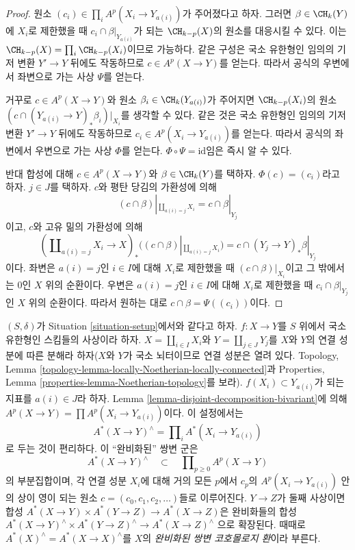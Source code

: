 \begin{proof}
원소 $(c_i) \in \prod_i A^p(X_i \to Y_{a(i)})$가 주어졌다고 하자.
그러면 $\beta \in \CH_k(Y)$에 $X_i$로 제한했을 때
$c_i \cap \beta|_{Y_{a(i)}}$가 되는 $\CH_{k - p}(X)$의 원소를
대응시킬 수 있다. 이는
$\CH_{k - p}(X) = \prod_i \CH_{k - p}(X_i)$이므로 가능하다.
같은 구성은 국소 유한형인 임의의 기저 변환 $Y' \to Y$ 뒤에도
작동하므로 $c \in A^p(X \to Y)$를 얻는다. 따라서 공식의 우변에서
좌변으로 가는 사상 $\Psi$를 얻는다.

거꾸로 $c \in A^p(X \to Y)$와 원소
$\beta_i \in \CH_k(Y_{a(i)})$가 주어지면
$\CH_{k - p}(X_i)$의 원소
$(c \cap (Y_{a(i)} \to Y)_*\beta_i)|_{X_i}$를 생각할 수 있다.
같은 것은 국소 유한형인 임의의 기저 변환 $Y' \to Y$ 뒤에도
작동하므로 $c_i \in A^p(X_i \to Y_{a(i)})$를 얻는다. 따라서 공식의
좌변에서 우변으로 가는 사상 $\Phi$를 얻는다.
$\Phi \circ \Psi = \text{id}$임은 즉시 알 수 있다.

반대 합성에 대해 $c \in A^p(X \to Y)$와
$\beta \in \CH_k(Y)$를 택하자. $\Phi(c) = (c_i)$라고 하자.
$j \in J$를 택하자. $c$와 평탄 당김의 가환성에 의해
$$
(c \cap \beta)|_{\coprod_{a(i) = j} X_i} =
c \cap \beta|_{Y_j}
$$
이고, $c$와 고유 밂의 가환성에 의해
$$
(\coprod\nolimits_{a(i) = j} X_i \to X)_*
((c \cap \beta)|_{\coprod_{a(i) = j} X_i})
=
c \cap (Y_j \to Y)_*\beta|_{Y_j}
$$
이다. 좌변은 $a(i) = j$인 $i \in I$에 대해 $X_i$로 제한했을 때
$(c \cap \beta)|_{X_i}$이고 그 밖에서는 $0$인 $X$ 위의 순환이다.
우변은 $a(i) = j$인 $i \in I$에 대해 $X_i$로 제한했을 때
$c_i \cap \beta|_{Y_j}$인 $X$ 위의 순환이다. 따라서 원하는 대로
$c \cap \beta = \Psi((c_i))$이다.
\end{proof}

\begin{remark}
\label{remark-completion-bivariant}
$(S, \delta)$가 Situation \ref{situation-setup}에서와 같다고 하자.
$f : X \to Y$를 $S$ 위에서 국소 유한형인 스킴들의 사상이라 하자.
$X = \coprod_{i \in I} X_i$와 $Y = \coprod_{j \in J} Y_j$를 $X$와 $Y$의
연결 성분에 따른 분해라 하자($X$와 $Y$가 국소 뇌터이므로 연결 성분은
열려 있다. Topology, Lemma
\ref{topology-lemma-locally-Noetherian-locally-connected}과 Properties,
Lemma \ref{properties-lemma-Noetherian-topology}를 보라).
$f(X_i) \subset Y_{a(i)}$가 되는 지표를 $a(i) \in J$라 하자. Lemma
\ref{lemma-disjoint-decomposition-bivariant}에 의해
$A^p(X \to Y) = \prod A^p(X_i \to Y_{a(i)})$이다. 이 설정에서는
$$
A^*(X \to Y)^\wedge = \prod\nolimits_i A^*(X_i \to Y_{a(i)})
$$
로 두는 것이 편리하다. 이 ``완비화된'' 쌍변 군은
$$
A^*(X \to Y)^\wedge \quad\subset\quad \prod\nolimits_{p \geq 0} A^p(X \to Y)
$$
의 부분집합이며, 각 연결 성분 $X_i$에 대해 거의 모든 $p$에서
$c_p$의 $A^p(X_i \to Y_{a(i)})$ 안의 상이 영이 되는 원소
$c = (c_0, c_1, c_2, \ldots)$들로 이루어진다.
$Y \to Z$가 둘째 사상이면 합성
$A^*(X \to Y) \times A^*(Y \to Z) \to A^*(X \to Z)$은 완비화들의 합성
$A^*(X \to Y)^\wedge \times A^*(Y \to Z)^\wedge \to A^*(X \to Z)^\wedge$
으로 확장된다. 때때로
$A^*(X)^\wedge = A^*(X \to X)^\wedge$를 $X$의
{\it 완비화된 쌍변 코호몰로지 환}이라 부른다.
\end{remark}

